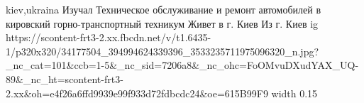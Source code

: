  
 
 
 
 

\par
kiev,ukraina
Изучал Техническое обслуживание и ремонт автомобилей в кировский горно-транспортный техникум
Живет в г. Киев
Из г. Киев
\ifcmt
  ig https://scontent-frt3-2.xx.fbcdn.net/v/t1.6435-1/p320x320/34177504_394994624339396_3533235711975096320_n.jpg?_nc_cat=101&ccb=1-5&_nc_sid=7206a8&_nc_ohc=FoOMvuDXudYAX_UQ-89&_nc_ht=scontent-frt3-2.xx&oh=e4f26a6ffd9939e99f933d72fdbcdc24&oe=615B99F9
  width 0.15
\fi

